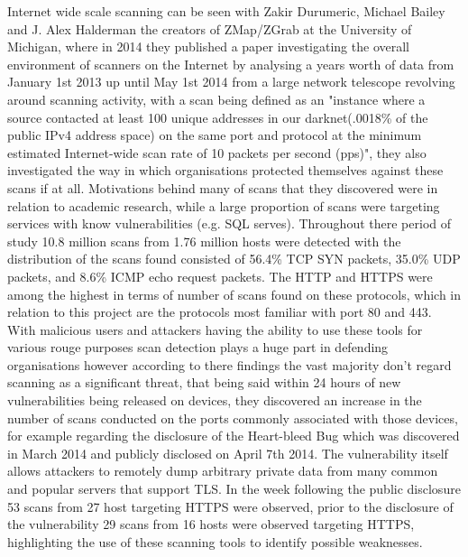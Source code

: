 \documentclass[a4wide,leqno,12pt]{report}
\begin{document}
Internet wide scale scanning can be seen with Zakir Durumeric, Michael Bailey and J. Alex Halderman the creators of ZMap/ZGrab at the University of Michigan,  where in 2014 they published a paper\cite{durumeric2014internet} investigating the overall environment of scanners on the Internet by analysing a years worth of data from January 1st 2013 up until May 1st 2014 from a large network telescope revolving around scanning activity, with a scan being defined as an "instance where a source contacted at least 100 unique addresses in our darknet(.0018\% of the public IPv4 address space) on the same port and protocol at the minimum estimated Internet-wide scan rate of 10 packets per second (pps)", they also investigated the way in which organisations protected themselves against these scans if at all. Motivations behind many of scans that they discovered were in relation to academic research, while a large proportion of scans were targeting services with know vulnerabilities (e.g. SQL serves). Throughout there period of study 10.8 million scans from 1.76 million hosts were detected with the distribution of the scans found consisted of 56.4\% TCP SYN packets, 35.0\% UDP packets, and 8.6\% ICMP echo request packets. The HTTP and HTTPS were among the highest in terms of number of scans found on these protocols, which in relation to this project are the protocols most familiar with port 80 and 443. With malicious users and attackers having the ability to use these tools for various rouge purposes scan detection plays a huge part in defending organisations however according to there findings the vast majority don't regard scanning as a significant threat, that being said within 24 hours of new vulnerabilities being released on devices, they discovered an increase in the number of scans conducted on the ports commonly associated with those devices, for example regarding the disclosure of the Heart-bleed Bug \cite{durumeric2014matter} which was discovered in March 2014 and publicly disclosed on April 7th 2014. The vulnerability itself allows attackers to remotely dump arbitrary private data from many common and popular servers that support TLS. In the week following the public disclosure 53 scans from 27 host targeting HTTPS were observed, prior to the disclosure of the vulnerability 29 scans from 16 hosts were observed targeting HTTPS, highlighting the use of these scanning tools to identify possible weaknesses.\\
\end{document}
